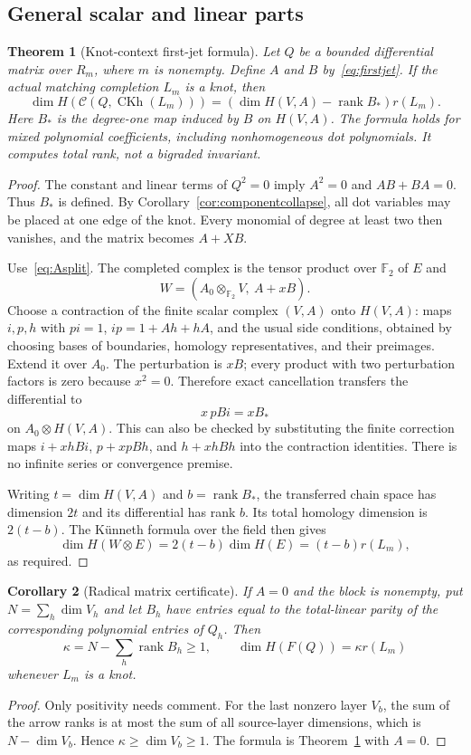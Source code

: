\documentclass[11pt]{article}
\newtheorem{theorem}{Theorem}[section]
\newtheorem{corollary}[theorem]{Corollary}
\theoremstyle{definition}\newtheorem{definition}[theorem]{Definition}\newtheorem{example}[theorem]{Example}
\theoremstyle{remark}\newtheorem{remark}[theorem]{Remark}
\newcommand{\F}{{\mathbb{F}_2}}
\newcommand{\rk}{\operatorname{rank}}
\newcommand{\CKh}{\operatorname{CKh}}
\begin{document}
\subsection{General scalar and linear parts}
\begin{theorem}[Knot-context first-jet formula]\label{thm:jet}
Let $Q$ be a bounded differential matrix over $R_m$, where $m$ is nonempty. Define $A$ and $B$ by~\eqref{eq:firstjet}. If the actual matching completion $L_m$ is a knot, then
\begin{equation}\label{eq:jettheorem}
 \dim H(\mathcal C(Q,\CKh(L_m)))=
 \left(\dim H(V,A)-\rk B_*\right)r(L_m).
\end{equation}
Here $B_*$ is the degree-one map induced by $B$ on $H(V,A)$. The formula holds for mixed polynomial coefficients, including nonhomogeneous dot polynomials. It computes total rank, not a bigraded invariant.
\end{theorem}
\begin{proof}
The constant and linear terms of $Q^2=0$ imply $A^2=0$ and $AB+BA=0$. Thus $B_*$ is defined. By Corollary~\ref{cor:componentcollapse}, all dot variables may be placed at one edge of the knot. Every monomial of degree at least two then vanishes, and the matrix becomes $A+XB$.

Use~\eqref{eq:Asplit}. The completed complex is the tensor product over $\F$ of $E$ and
\[
 W=(A_0\otimes_\F V,\ A+xB).
\]
Choose a contraction of the finite scalar complex $(V,A)$ onto $H(V,A)$: maps $i,p,h$ with $pi=1$, $ip=1+Ah+hA$, and the usual side conditions, obtained by choosing bases of boundaries, homology representatives, and their preimages. Extend it over $A_0$. The perturbation is $xB$; every product with two perturbation factors is zero because $x^2=0$. Therefore exact cancellation transfers the differential to
\[
 x\,pBi=xB_*
\]
on $A_0\otimes H(V,A)$. This can also be checked by substituting the finite correction maps $i+xhBi$, $p+xpBh$, and $h+xhBh$ into the contraction identities. There is no infinite series or convergence premise.

Writing $t=\dim H(V,A)$ and $b=\rk B_*$, the transferred chain space has dimension $2t$ and its differential has rank $b$. Its total homology dimension is $2(t-b)$. The K\"unneth formula over the field then gives
\[
 \dim H(W\otimes E)=2(t-b)\dim H(E)=(t-b)r(L_m),
\]
as required.
\end{proof}

\begin{corollary}[Radical matrix certificate]\label{cor:radjet}
If $A=0$ and the block is nonempty, put $N=\sum_h\dim V_h$ and let $B_h$ have entries equal to the total-linear parity of the corresponding polynomial entries of $Q_h$. Then
\[
 \kappa=N-\sum_h\rk B_h\ge1,
 \qquad \dim H(F(Q))=\kappa r(L_m)
\]
whenever $L_m$ is a knot.
\end{corollary}
\begin{proof}
Only positivity needs comment. For the last nonzero layer $V_b$, the sum of the arrow ranks is at most the sum of all source-layer dimensions, which is $N-\dim V_b$. Hence $\kappa\ge\dim V_b\ge1$. The formula is Theorem~\ref{thm:jet} with $A=0$.
\end{proof}
\end{document}
